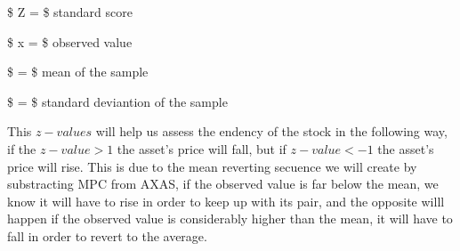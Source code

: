 \documentclass[11pt]{article}
\begin{document}
\$ Z = \$ standard score

\$ x = \$ observed value

\$ \mu = \$ mean of the sample

\$ \sigma = \$ standard deviantion of the sample

This \(z-values\) will help us assess the endency of the stock in the
following way, if the \(z-value > 1\) the asset's price will fall, but
if \(z-value < -1\) the asset's price will rise. This is due to the mean
reverting secuence we will create by substracting MPC from AXAS, if the
observed value is far below the mean, we know it will have to rise in
order to keep up with its pair, and the opposite willl happen if the
observed value is considerably higher than the mean, it will have to
fall in order to revert to the average.
\end{document}
